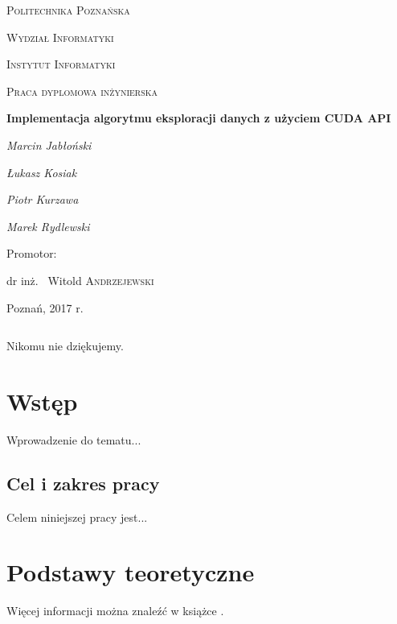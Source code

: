 \documentclass{article}
\begin{document}
\begin{titlepage}
	\centering
	{\scshape\LARGE Politechnika Poznańska \par}
	{\scshape\LARGE Wydział Informatyki \par}
	{\scshape\LARGE Instytut Informatyki \par}
	\vspace{1cm}
	{\scshape\Large Praca dyplomowa inżynierska\par}
	\vspace{1.5cm}
	{\huge\bfseries Implementacja algorytmu eksploracji danych z użyciem CUDA API\par}
	\vspace{2cm}
	{\Large\itshape Marcin Jabłoński \par}
	{\Large\itshape Łukasz Kosiak \par}
	{\Large\itshape Piotr Kurzawa \par}
	{\Large\itshape Marek Rydlewski \par}
	\vfill
	\begin{flushright}
	Promotor:\par
	dr inż. ~Witold \textsc{Andrzejewski}
	\end{flushright}
	\vfill
	{\large Poznań, 2017 r.\par}
\end{titlepage}
\thispagestyle{empty} %
$\mbox{ }$
\vfill\vfill
\hfill
\begin{flushright}
\begin{em}
Nikomu nie dziękujemy. \\
\end{em}
\end{flushright}
\vfill\pagebreak
\tableofcontents

\section{Wstęp}

Wprowadzenie do tematu...

\subsection{Cel i zakres pracy}
Celem niniejszej pracy jest...

\section{Podstawy teoretyczne}

Więcej informacji można znaleźć w książce \cite{sop}.
\end{document}
